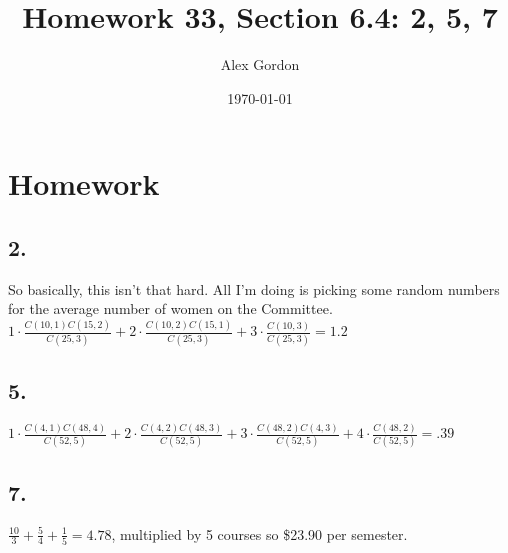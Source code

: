 \documentclass[12]{scrartcl}
\begin{document}
\title{Homework 33, Section 6.4: 2, 5, 7}
\author{Alex Gordon}
\date{\today}
\maketitle
\section*{Homework}
\subsection*{2.}
So basically, this isn't that hard. All I'm doing is picking some random numbers for the average number of women on the Committee. \\
$1 \cdot \frac{C(10,1)C(15,2)}{C(25,3)} + 2 \cdot \frac{C(10,2)C(15,1)}{C(25,3)} + 3 \cdot \frac{C(10,3)}{C(25,3)} = 1.2$

\subsection*{5.}
$1 \cdot \frac{C(4,1)C(48,4)}{C(52,5)} + 2 \cdot \frac{C(4,2)C(48,3)}{C(52,5)} + 3 \cdot \frac{C(48,2)C(4,3)}{C(52,5)} + 4 \cdot \frac{C(48,2)}{C(52,5)} = .39$
\subsection*{7.}
$\frac{10}{3} + \frac{5}{4} + \frac{1}{5} = 4.78$, multiplied by 5 courses so \$23.90 per semester. 
\end{document}
